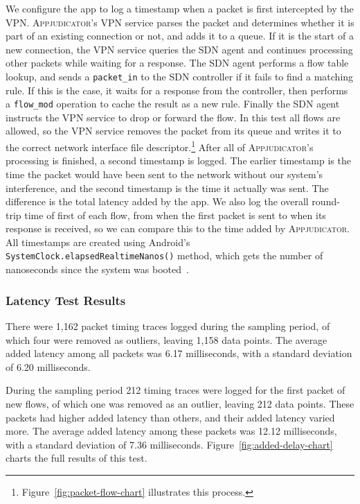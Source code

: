 We configure the app to log a timestamp when a packet is first intercepted by
the VPN. \textsc{Appjudicator}'s VPN service parses the packet and determines
whether it is part of an existing connection or not, and adds it to a queue. If
it is the start of a new connection, the VPN service queries the SDN agent and
continues processing other packets while waiting for a response. The SDN agent
performs a flow table lookup, and sends a \texttt{packet\_in} to the SDN
controller if it fails to find a matching rule. If this is the case, it waits
for a response from the controller, then performs a \texttt{flow\_mod} operation
to cache the result as a new rule. Finally the SDN agent instructs the VPN
service to drop or forward the flow. In this test all flows are allowed, so the
VPN service removes the packet from its queue and writes it to the correct
network interface file descriptor.\footnote{Figure~\ref{fig:packet-flow-chart}
illustrates this process.} After all of \textsc{Appjudicator}'s processing is
finished, a second timestamp is logged. The earlier timestamp is the time the
packet would have been sent to the network without our system's interference,
and the second timestamp is the time it actually was sent. The difference is the
total latency added by the app. We also log the overall round-trip time of first
of each flow, from when the first packet is sent to when its response is
received, so we can compare this to the time added by \textsc{Appjudicator}. All
timestamps are created using Android's
\texttt{SystemClock.elapsedRealtimeNanos()} method, which gets the number of
nanoseconds since the system was booted~\cite{androidsystemclock}.

\subsubsection{Latency Test Results}
\label{sec:latency-test-results}

There were 1,162 packet timing traces logged during the sampling period, of
which four were removed as outliers, leaving 1,158 data points. The average
added latency among all packets was 6.17 milliseconds, with a standard deviation
of 6.20 milliseconds.

During the sampling period 212 timing traces were logged for the first packet of
new flows, of which one was removed as an outlier, leaving 212 data points.
These packets had higher added latency than others, and their added latency
varied more. The average added latency among these packets was 12.12
milliseconds, with a standard deviation of 7.36 milliseconds.
Figure~\ref{fig:added-delay-chart} charts the full results of this test.

